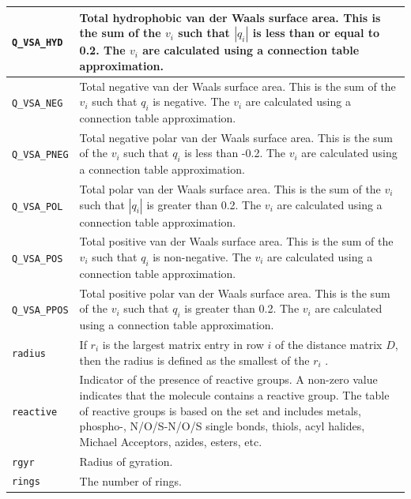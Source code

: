 \documentclass[12pt,a4paper]{article}
\begin{document}
\begin{longtable}{@{\zz}|p{}|p{}|}
\texttt{Q\_VSA\_HYD} & Total hydrophobic van der Waals surface 
area. This is the sum of the $v_i$ such that $|q_i|$ is less 
than or equal to 0.2. The $v_i$ are calculated using a connection 
table approximation.\\ \hline

\texttt{Q\_VSA\_NEG} & Total negative van der Waals surface area. 
This is the sum of the $v_i$ such that $q_i$ is negative. The 
$v_i$ are calculated using a connection table approximation.\\ \hline

\texttt{Q\_VSA\_PNEG} & Total negative polar van der Waals surface 
area. This is the sum of the $v_i$ such that $q_i$ is less than 
-0.2. The $v_i$ are calculated using a connection table approximation.\\ \hline

\texttt{Q\_VSA\_POL} & Total polar van der Waals surface area. This 
is the sum of the $v_i$ such that $|q_i|$ is greater than 0.2. The 
$v_i$ are calculated using a connection table approximation.\\ \hline

\texttt{Q\_VSA\_POS} & Total positive van der Waals surface area. 
This is the sum of the $v_i$ such that $q_i$ is non-negative. 
The $v_i$ are calculated using a connection table approximation.\\ \hline

\texttt{Q\_VSA\_PPOS} & Total positive polar van der Waals surface 
area. This is the sum of the $v_i$ such that $q_i$ is greater than 
0.2. The $v_i$ are calculated using a connection table approximation.\\ \hline

\texttt{radius} & If $r_i$ is the largest matrix entry in row $i$ of the 
distance matrix $D$, then the radius is defined as the smallest of the $r_i$
\cite{Petitjean1992}.\\ \hline

\texttt{reactive} & Indicator of the presence of reactive groups. A 
non-zero value indicates that the molecule contains a reactive group. 
The table of reactive groups is based on the \cite{Oprea2000} set and 
includes metals, phospho-, N/O/S-N/O/S single bonds, thiols, acyl 
halides, Michael Acceptors, azides, esters, etc.\\ \hline

\texttt{rgyr} & Radius of gyration.\\ \hline

\texttt{rings} & The number of rings.\\ \hline


\end{longtable}
\end{document}
